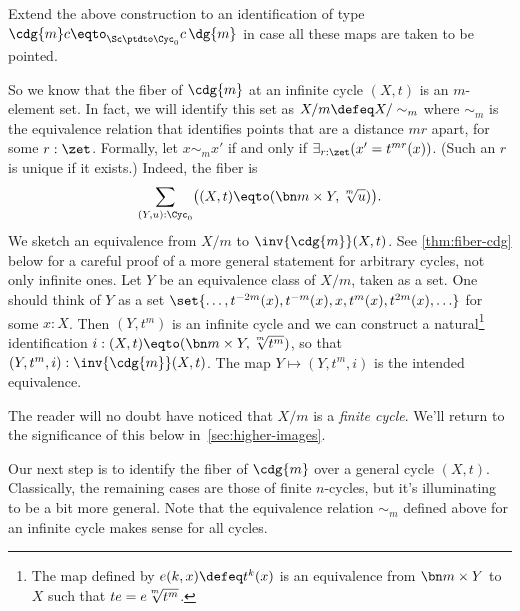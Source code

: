 \begin{xca}\label{xca:pointed-maps-circle}
Extend the above construction to an identification of type $\cdg{m}c\eqto_{\Sc\ptdto\Cyc_0}c\,\dg{m}$
in case all these maps are taken to be pointed.
\end{xca}

So we know that the fiber of $\cdg{m}$ at an infinite cycle $(X,t)$
is an $m$-element set. In fact, we will identify this set as
$X/m \defeq X/\sim_m$ where $\sim_m$ is the equivalence relation that
identifies points that are a distance $mr$ apart, for some $r:\zet$.
Formally, let $x\sim_m x'$ if and only if $\exists_{r:\zet}(x'=t^{mr}(x))$.
(Such an $r$ is unique if it exists.)
Indeed, the fiber is
\[
  \sum_{(Y,u):\Cyc_0}\bigl((X,t) \eqto (\bn m\times Y, \sqrt[\uproot{2}m]{u})\bigr).
\]
We sketch an equivalence from $X/m$ to $\inv{\cdg{m}}(X,t)$.
See \cref{thm:fiber-cdg} below for a careful proof of a
more general statement for arbitrary cycles, not only infinite ones.
Let $Y$ be an equivalence class of $X/m$, taken as a set.
One should think of $Y$ as a set
$\set{\ldots,t^{-2m}(x),t^{-m}(x),x,t^m(x),t^{2m}(x),\ldots}$
for some $x:X$. Then $(Y,t^m)$ is an infinite cycle and we can construct a
natural\footnote{%
The map defined by $e(k,x)\defeq t^k(x)$ is an equivalence from
$\bn m\times Y$ to $X$ such that $te=e\sqrt[\uproot{2}m]{t^m}$.}
identification $i:(X,t) \eqto (\bn m\times Y, \sqrt[\uproot{2}m]{t^m})$,
so that $(Y,t^m,i): \inv{\cdg{m}}(X,t)$. The map $Y\mapsto(Y,t^m,i)$
is the intended equivalence.

The reader will no doubt have noticed that $X/m$ is a \emph{finite cycle}.
We'll return to the significance of this below in~\cref{sec:higher-images}.

Our next step is to identify the fiber of $\cdg{m}$ over a general cycle $(X,t)$.
Classically, the remaining cases are those of finite $n$-cycles,
but it's illuminating to be a bit more general.
Note that the equivalence relation $\sim_m$ defined above for an infinite cycle
makes sense for all cycles.

